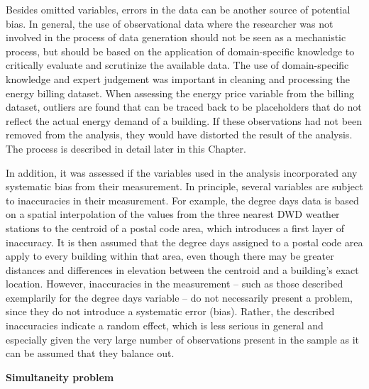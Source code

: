 \documentclass[12pt,twoside]{reedthesis}
\begin{document}
Besides omitted variables, errors in the data can be another source of potential bias. In general, the use of observational data where the researcher was not involved in the process of data generation should not be seen as a mechanistic process, but should be based on the application of domain-specific knowledge to critically evaluate and scrutinize the available data. The use of domain-specific knowledge and expert judgement was important in cleaning and processing the energy billing dataset. When assessing the energy price variable from the billing dataset, outliers are found that can be traced back to be placeholders that do not reflect the actual energy demand of a building. If these observations had not been removed from the analysis, they would have distorted the result of the analysis. The process is described in detail later in this Chapter.

In addition, it was assessed if the variables used in the analysis incorporated any systematic bias from their measurement. In principle, several variables are subject to inaccuracies in their measurement. For example, the degree days data is based on a spatial interpolation of the values from the three nearest DWD weather stations to the centroid of a postal code area, which introduces a first layer of inaccuracy. It is then assumed that the degree days assigned to a postal code area apply to every building within that area, even though there may be greater distances and differences in elevation between the centroid and a building's exact location. However, inaccuracies in the measurement -- such as those described exemplarily for the degree days variable -- do not necessarily present a problem, since they do not introduce a systematic error (bias). Rather, the described inaccuracies indicate a random effect, which is less serious in general and especially given the very large number of observations present in the sample as it can be assumed that they balance out.

\textbf{Simultaneity problem}
\end{document}

